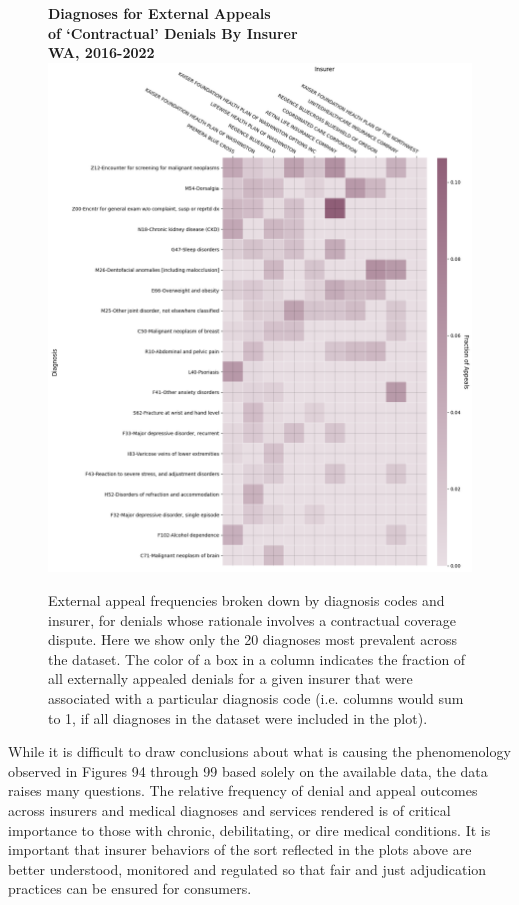 \documentclass[12pt, a4paper,twoside,parskip=full]{report}
\theoremstyle{plain} %
\theoremstyle{definition} %
\theoremstyle{remark} %
\numberwithin{equation}{chapter}
\begin{document}
		\begin{figure}[h!]
			\centering
			\textbf{Diagnoses for External Appeals}\\
			\textbf{of `Contractual' Denials By Insurer}\\
			\textbf{WA, 2016-2022}\\
			\includegraphics[width=.8\textwidth]{images/wa_external_appeals/contractual_diagnosis_by_insurer.png}
			\caption{External appeal frequencies broken down by diagnosis codes and insurer, for denials whose rationale involves a contractual coverage dispute. Here we show only the 20 diagnoses most prevalent across the dataset. The color of a box in a column indicates the fraction of all externally appealed denials for a given insurer that were associated with a particular diagnosis code (i.e. columns would sum to 1, if all diagnoses in the dataset were included in the plot).}
			\label{wacontractualexternalappealsbydiagnosisinsurer}
		\end{figure}
	\clearpage
		
		
		While it is difficult to draw conclusions about what is causing the phenomenology observed in Figures 94 through 99 based solely on the available data, the data raises many questions. The relative frequency of denial and appeal outcomes across insurers and medical diagnoses and services rendered is of critical importance to those with chronic, debilitating, or dire medical conditions. It is important that insurer behaviors of the sort reflected in the plots above are better understood, monitored and regulated so that fair and just adjudication practices can be ensured for consumers.
		
\end{document}

